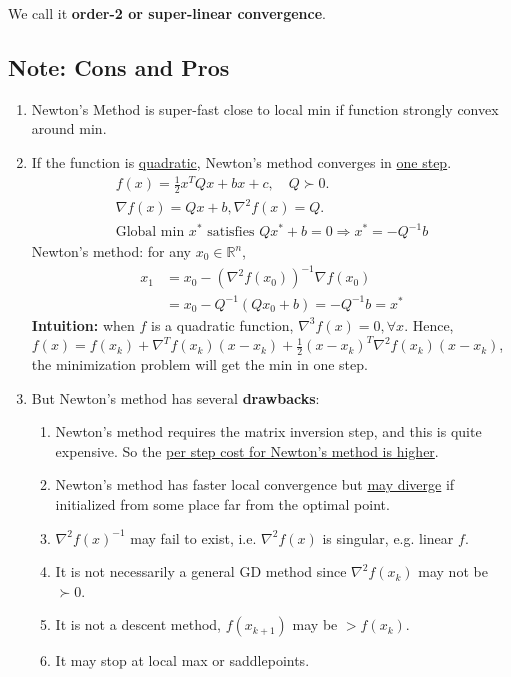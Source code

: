\documentclass[11pt,a4paper]{article}
\begin{document}
We call it \textbf{order-2 or super-linear convergence}.

\subsection{Note: Cons and Pros}
\begin{enumerate}[$\bullet$]
    \item Newton's Method is super-fast close to local min if function strongly convex around min.
    \item If the function is \underline{quadratic}, Newton's method converges in \underline{one step}.
    \begin{equation}
        \begin{aligned}
            f(x)=\frac{1}{2}x^TQx+bx+c,\quad Q\succ 0.\\
            \nabla f(x)=Qx+b,\nabla^2 f(x)=Q.\\
            \text{Global min $x^*$ satisfies } Qx^*+b=0 \Rightarrow	x^*=-Q^{-1}b
        \end{aligned}
        \nonumber
    \end{equation}
    Newton's method: for any $x_0\in \mathbb{R}^n$,
    \begin{equation}
        \begin{aligned}
            x_1&=x_0-(\nabla^2 f(x_0))^{-1}\nabla f(x_0)\\
            &=x_0-Q^{-1}(Qx_0+b)=-Q^{-1}b=x^*
        \end{aligned}
        \nonumber
    \end{equation}
    \textbf{Intuition:} when $f$ is a quadratic function, $\nabla^3 f(x)=0, \forall x$. Hence, $f(x)= f(x_k)+\nabla^T f(x_k)(x-x_k)+\frac{1}{2}(x-x_k)^T \nabla^2 f(x_k) (x-x_k)$, the minimization problem will get the min in one step.
    \item But Newton's method has several \textbf{drawbacks}:
    \begin{enumerate}[(1)]
        \item Newton’s method requires the matrix inversion step, and this is quite expensive. So the \underline{per step cost for Newton’s method is higher}.
        \item Newton’s method has faster local convergence but \underline{may diverge} if initialized from some place far from the optimal point.
        \item $\nabla^2 f(x)^{-1}$ may fail to exist, i.e. $\nabla^2 f(x)$ is singular, e.g. linear $f$.
        \item It is not necessarily a general GD method since $\nabla^2 f(x_k)$ may not be $\succ 0$.
        \item It is not a descent method, $f(x_{k+1})$ may be $> f(x_k)$.
        \item It may stop at local max or saddlepoints.
    \end{enumerate}
\end{enumerate}
\end{document}
